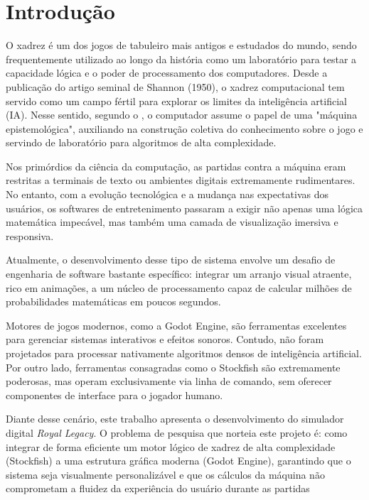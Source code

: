 \chapter{Introdução}
\label{capitulo:introducao}

O xadrez é um dos jogos de tabuleiro mais antigos e estudados do mundo, sendo frequentemente utilizado ao longo da história como um laboratório para testar a capacidade lógica e o poder de processamento dos computadores. Desde a publicação do artigo seminal de Shannon (1950), o xadrez computacional tem servido como um campo fértil para explorar os limites da inteligência artificial (IA). Nesse sentido, segundo o , o computador assume o papel de uma "máquina epistemológica", auxiliando na construção coletiva do conhecimento sobre o jogo e servindo de laboratório para algoritmos de alta complexidade.

Nos primórdios da ciência da computação, as partidas contra a máquina eram restritas a terminais de texto ou ambientes digitais extremamente rudimentares. No entanto, com a evolução tecnológica e a mudança nas expectativas dos usuários, os softwares de entretenimento passaram a exigir não apenas uma lógica matemática impecável, mas também uma camada de visualização imersiva e responsiva.

Atualmente, o desenvolvimento desse tipo de sistema envolve um desafio de engenharia de software bastante específico: integrar um arranjo visual atraente, rico em animações, a um núcleo de processamento capaz de calcular milhões de probabilidades matemáticas em poucos segundos. 

Motores de jogos modernos, como a Godot Engine, são ferramentas excelentes para gerenciar sistemas interativos e efeitos sonoros. Contudo, não foram projetados para processar nativamente algoritmos densos de inteligência artificial. Por outro lado, ferramentas consagradas como o Stockfish são extremamente poderosas, mas operam exclusivamente via linha de comando, sem oferecer componentes de interface para o jogador humano.

Diante desse cenário, este trabalho apresenta o desenvolvimento do simulador digital \textit{Royal Legacy}. O problema de pesquisa que norteia este projeto é: como integrar de forma eficiente um motor lógico de xadrez de alta complexidade (Stockfish) a uma estrutura gráfica moderna (Godot Engine), garantindo que o sistema seja visualmente personalizável e que os cálculos da máquina não comprometam a fluidez da experiência do usuário durante as partidas

